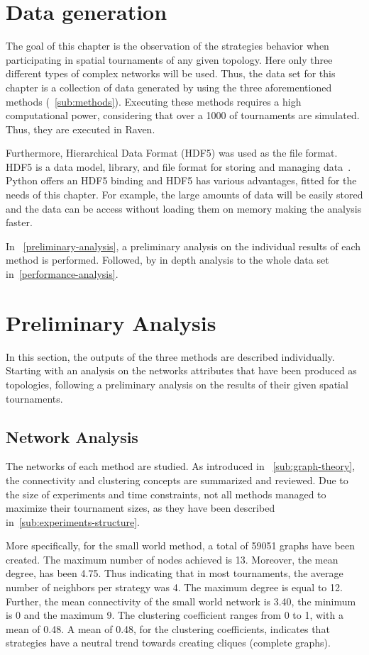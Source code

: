 \section{Data generation}
The goal of this chapter is the observation of the strategies behavior when
participating in spatial tournaments of any given topology. Here only three
different types of complex networks will be used. Thus, the data set for this
chapter is a collection of data generated by using the three aforementioned
methods (~\autoref{sub:methods}). Executing these methods requires a high
computational power, considering that over a 1000 of tournaments are
simulated. Thus, they are executed in Raven.

Furthermore, Hierarchical Data Format (HDF5) was used as the file format.
HDF5 is a data model, library, and file format for storing and managing data~\cite{hdf5}.
Python offers an HDF5 binding and HDF5 has various advantages, fitted for the needs
of this chapter. For example, the large amounts of data will be easily stored
and the data can be access without loading them on memory making the analysis
faster.

In ~\autoref{preliminary-analysis}, a preliminary analysis on the individual results of each method
is performed. Followed, by in depth analysis to the whole data set in~\autoref{performance-analysis}.

\section{Preliminary Analysis}
\label{preliminary-analysis}
In this section, the outputs of the three methods are described individually.
Starting with an analysis on the networks attributes that have been produced as topologies,
following a preliminary analysis on the results of their given spatial tournaments.

\subsection{Network Analysis}
\label{sub:network-analysis}
The networks of each method are studied. As introduced in ~\autoref{sub:graph-theory}, the
connectivity and clustering concepts are summarized and reviewed. Due to the
size of experiments and time constraints, not all methods managed to
maximize their tournament sizes, as they have been described in~\autoref{sub:experiments-structure}.

More specifically, for the small world method, a total of 59051 graphs have
been created. The maximum number of nodes achieved is 13. Moreover, the
mean degree, has been 4.75. Thus indicating that
in most tournaments, the average number of neighbors per strategy was 4.
The maximum degree is equal to 12. Further,
the mean connectivity of the small world network is 3.40, the minimum is 0 and the maximum 9.
The clustering coefficient ranges from 0 to 1, with a mean of 0.48. A mean
of 0.48, for the clustering coefficients, indicates that strategies have a
neutral trend towards creating cliques (complete graphs).

